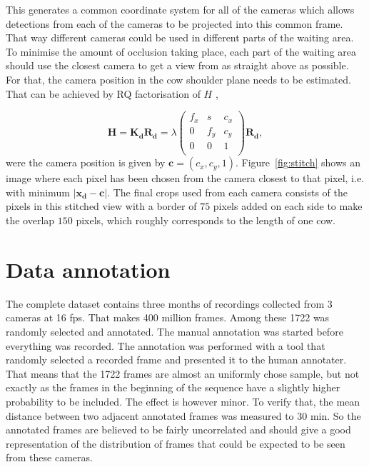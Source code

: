 \documentclass{cta-author}
\begin{document}
This generates a common coordinate system for all of the cameras which allows detections from each of the cameras to be projected into this common frame. That way different cameras could be used in different parts of the waiting area. To minimise the amount of occlusion taking place, each part of the waiting area should use the closest camera to get a view from as straight above as possible. For that, the camera position in the cow shoulder plane needs to be estimated. That can be achieved by RQ factorisation of $H$ \cite{Hartley2004}, 

\begin{equation}
\bm H = \bm {K_d} \bm {R_d} = 
    \lambda
	\left(
	\begin{array}{ccc}
		f_x & s & c_x  \\
		0 & f_y & c_y  \\
		0 & 0 & 1  \\
	\end{array}
	\right)
	\bm {R_d} ,
\end{equation}
were the camera position is given by $\bm c = \left(c_x, c_y, 1\right)$. Figure~\ref{fig:stitch} shows an image where each pixel has been chosen from the camera closest to that pixel, i.e. with  minimum $\left| \bm {x_d} - \bm c \right|$. The final crops used from each camera consists of the pixels in this stitched view with a border of $75$ pixels added on each side to make the overlap $150$ pixels, which roughly corresponds to the length of one cow.


\section{Data annotation}

The complete dataset contains three months of recordings collected from 3 cameras at 16 fps. That makes 400 million frames. Among these 1722 was randomly selected and annotated. The manual annotation was started before everything was recorded. The annotation was performed with a tool that randomly selected a recorded frame and presented it to the human annotater. That means that the 1722 frames are almost an uniformly chose sample, but not exactly as the frames in the beginning of the sequence have a slightly higher probability to be included. The effect is however minor. To verify that, 
the mean distance between two adjacent annotated frames was measured to 30 min. So the annotated frames are believed to be fairly uncorrelated and should give a good representation of the distribution of frames that could be expected to be seen from these cameras.
\end{document}
